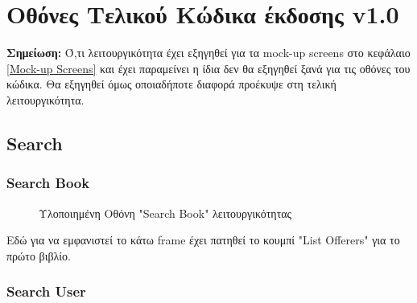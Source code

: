 \documentclass[12pt,a4paper]{article}
\begin{document}
\section{Οθόνες Τελικού Κώδικα έκδοσης v1.0}
\label{Code Screens}

\textbf{Σημείωση:} Ό,τι λειτουργικότητα έχει εξηγηθεί για τα mock-up screens στο κεφάλαιο \ref{Mock-up Screens} και έχει παραμείνει η ίδια δεν θα εξηγηθεί ξανά για τις οθόνες του κώδικα. Θα εξηγηθεί όμως οποιαδήποτε διαφορά προέκυψε στη τελική λειτουργικότητα.

\subsection{Search}

\subsubsection{Search Book}

\begin{figure}[H]
	\caption{Υλοποιημένη Οθόνη "Search Book" λειτουργικότητας}
	\label{Υλοποιημένη Οθόνη "Search Book" λειτουργικότητας}
\end{figure}

Εδώ για να εμφανιστεί το κάτω frame έχει πατηθεί το κουμπί "List Offerers" για το πρώτο βιβλίο.

\subsubsection{Search User}
\end{document}

